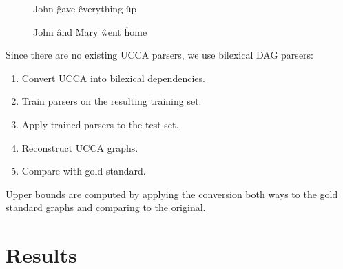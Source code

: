 \documentclass[a0,portrait]{a0poster}
\begin{document}
\begin{multicols}{2}
\begin{figure}
	\vspace{-1cm}
	\begin{dependency}[theme = simple]
	\begin{deptext}[column sep=.7em,ampersand replacement=\^]
	John \^ gave \^ everything \^ up \\
	\end{deptext}
	\end{dependency}
	\begin{dependency}[theme = simple]
	\begin{deptext}[column sep=.7em,ampersand replacement=\^]
	John \^ and \^ Mary \^ went \^ home \\
	\end{deptext}
	\end{dependency}
\end{figure}

Since there are no existing UCCA parsers, we use bilexical DAG parsers:
\begin{enumerate}
 \item Convert UCCA into bilexical dependencies.
 \item Train parsers on the resulting training set.
 \item Apply trained parsers to the test set.
 \item Reconstruct UCCA graphs.
 \item Compare with gold standard.
\end{enumerate}
Upper bounds are computed by applying
the conversion both ways to the gold standard
graphs and comparing to the original.





\section*{Results}


\end{multicols}
\end{document}
